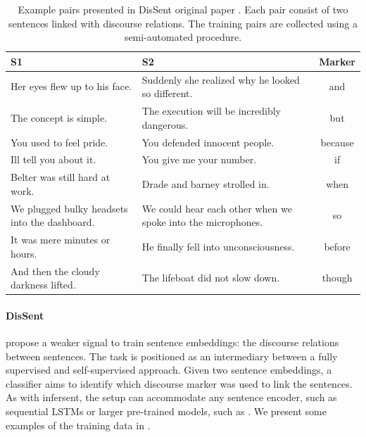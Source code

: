 

\begin{table}[!htb]
\centering
\footnotesize
\begin{tabularx}{16cm}{@{}X X c@{}}
\toprule
\textbf{S1} & \textbf{S2} & \textbf{Marker}\\
\midrule
\midrule 
Her eyes flew up to his face.
&Suddenly she realized why he looked so different.&
and\\[0.4cm]
The concept is simple.
&The execution will be incredibly dangerous.&
but \\[0.2cm]
You used to feel pride.
&You defended innocent people.&
because \\[0.2cm]
Ill tell you about it.
&You give me your number.&
if \\[0.2cm]
Belter was still hard at work.
&Drade and barney strolled in.&
when \\[0.2cm]
We plugged bulky headsets into the dashboard.
&We could hear each other when we spoke into the microphones.&
so \\[0.4cm]
It was mere minutes or hours.
&He finally fell into unconsciousness.&
before \\[0.2cm]
And then the cloudy darkness lifted.
&The lifeboat did not slow down.&
though \\[0.2cm]
\bottomrule
\end{tabularx}
\caption{Example pairs presented in DisSent original paper \parencite{nie_19}. Each pair consist of two sentences linked with discourse relations. The training pairs are collected using a semi-automated procedure.}
\end{table}

\paragraph{DisSent} \textcite{nie_19} propose a weaker signal to train sentence embeddings: the discourse relations between sentences. The task is positioned as an intermediary between a fully supervised and self-supervised approach. Given two sentence embeddings, a classifier aims to identify which discourse marker was used to link the sentences. As with infersent, the setup can accommodate any sentence encoder, such as sequential LSTMs or larger pre-trained models, such as \bert. We present some examples of the training data in .

